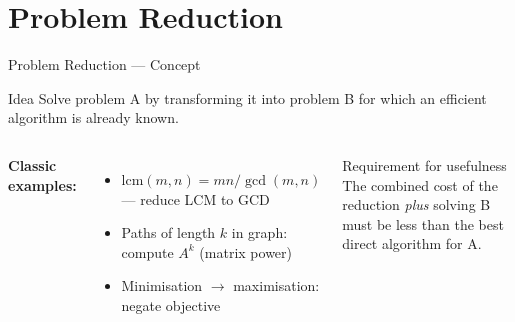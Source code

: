 \documentclass[aspectratio=169]{beamer}
\begin{document}
\section{Problem Reduction}

\begin{frame}[shrink=12]{Problem Reduction — Concept}
  \begin{block}{Idea}
    Solve problem A by transforming it into problem B for which
    an efficient algorithm is already known.
  \end{block}
  \vspace{0.3em}
  \vspace{0.4em}
  \begin{columns}[T]
      \textbf{Classic examples:}
      \begin{itemize}
        \item $\mathrm{lcm}(m,n) = mn/\gcd(m,n)$ — reduce LCM to GCD
        \item Paths of length $k$ in graph: compute $A^k$ (matrix power)
        \item Minimisation $\to$ maximisation: negate objective
      \end{itemize}
      \begin{alertblock}{Requirement for usefulness}
        The combined cost of the reduction \emph{plus} solving B must
        be less than the best direct algorithm for A.
      \end{alertblock}
  \end{columns}
\end{frame}
\end{document}

